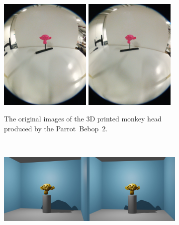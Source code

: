 \begin{figure}[h!]
	\centering
	\begin{subfigure}[t]{\textwidth}
		\centering
		\includegraphics[width=0.48\textwidth]{img/experiment1_original_bebop_img_1.jpg}
		\hfill
		\includegraphics[width=0.48\textwidth]{img/experiment1_original_bebop_img_2.jpg}
		\caption{The original images of the 3D printed monkey head produced by the Parrot~Bebop~2.}
	\end{subfigure}
	~ 
	\begin{subfigure}[t]{\textwidth}
		\centering
		\includegraphics[width=\textwidth]{img/experiment2_environment_comparison_2.jpg}

\end{subfigure}
\end{figure}
